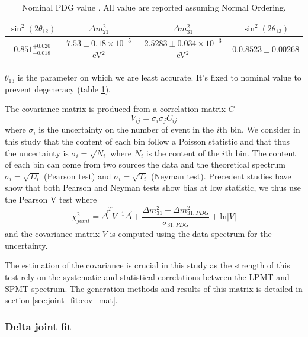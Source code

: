 \documentclass[../main.tex]{subfiles}
\begin{document}
\begin{table}
  \centering
  \begin{tabular}{c|c|c|c}
    $\sin^2(2\theta_{12})$    & $\Delta m^2_{21}$                       & $\Delta m^2_{31}$      & $\sin^2(2\theta_{13})$ \\
    \hline
    $0.851^{+0.020}_{-0.018}$ & $7.53 \pm 0.18 \times 10^{-5}$ eV$^2$   & $2.5283 \pm 0.034 \times 10^{-3}$ eV$^2$  & $0.0.8523 \pm 0.00268$
  \end{tabular}
  \caption{Nominal PDG value \cite{particle_data_group_review_2020}. All value are reported assuming Normal Ordering.}
  \label{tab:joint_fit:pdg_value}
\end{table}



$\theta_{13}$ is the parameter on which we are least accurate. It's fixed to nominal value to prevent degeneracy (table \ref{tab:joint_fit:pdg_value}).

The covariance matrix is produced from a correlation matrix $C$
\begin{equation}
  V_{ij} = \sigma_{i} \sigma_{j} C_{ij}
\end{equation}
where $\sigma_{i}$ is the uncertainty on the number of event in the $i$th bin. We consider in this study that the content of each bin follow a Poisson statistic and that thus the uncertainty is $\sigma_i = \sqrt{N_i}$ where $N_i$ is the content of the $i$th bin. The content of each bin can come from two sources the data and the theoretical spectrum $\sigma_i = \sqrt{D_i}$ (Pearson test) and $\sigma_i = \sqrt{T_i}$ (Neyman test). Precedent studies have show that both Pearson and Neyman tests show bias at low statistic, we thus use the Pearson V test where
\begin{equation}
  \label{eq:joint_fit:pearsonV}
  \chi^2_{joint} = \vec{\Delta}^T V^{-1} \vec{\Delta} + \frac{\Delta m^2_{31} - \Delta m^2_{31,PDG}}{\sigma_{31, PDG}} + \mathrm{ln} | V |
\end{equation}
and the covariance matrix $V$ is computed using the data spectrum for the uncertainty.

The estimation of the covariance is crucial in this study as the strength of this test rely on the systematic and statistical correlations between the LPMT and SPMT spectrum. The generation methods and results of this matrix is detailed in section \ref{sec:joint_fit:cov_mat}.

\subsubsection{Delta joint fit}
\end{document}
